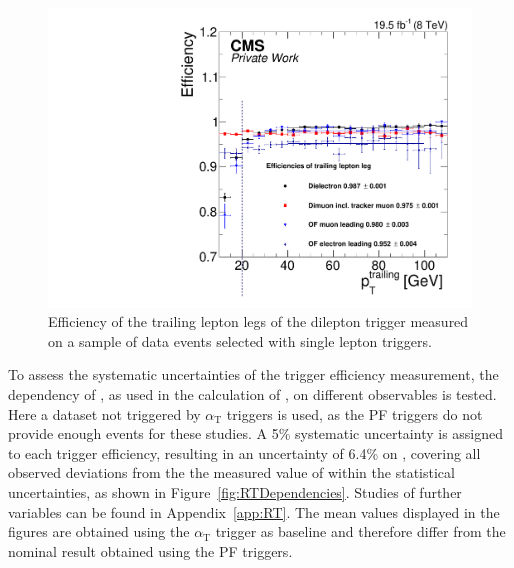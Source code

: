 \begin{figure}
\begin{center}
\includegraphics[scale=0.35]{plots/BG/trigger/Triggereff_SingleLepton_HighHTExclusive_Full2012_TrailingPt_leadingPt30Single.pdf}
\caption{Efficiency of the trailing lepton legs of the dilepton trigger measured on a sample of data events selected with single lepton triggers.}
\label{fig:triggerEffTrailing}
\end{center}
\end{figure} 
To assess the systematic uncertainties of the trigger efficiency measurement, the dependency of \RT, as used in the calculation of \Rsfof, on different observables is tested. Here a dataset not triggered by $\alpha_\mathrm{T}$ triggers is used, as the PF \HT triggers do not provide enough events for these studies. A 5\% systematic uncertainty is assigned to each trigger efficiency, resulting in an uncertainty of 6.4\% on \RT, covering all observed deviations from the the measured value of \RT within the statistical uncertainties, as shown in Figure~\ref{fig:RTDependencies}. Studies of further variables can be found in Appendix~\ref{app:RT}. The mean \RT values displayed in the figures are obtained using the $\alpha_{\mathrm{T}}$ trigger as baseline and therefore differ from the nominal result obtained using the PF \HT triggers. 
